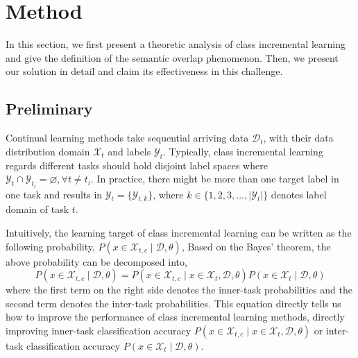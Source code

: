 \section{Method}
\label{sec:Method}

% 

In this section, we first present a theoretic analysis of class incremental learning and give the definition of the semantic overlap phenomenon. Then, we present our solution in detail and claim its effectiveness in this challenge.

\subsection{Preliminary}
\label{sec3-1:PSO_in_CL}


Continual learning methods take sequential arriving data $\mathcal{D}_t$, with their data distribution domain $\mathcal{X}_t$ and labels $\mathcal{Y}_t$. Typically, class incremental learning regards different tasks should hold disjoint label spaces where $\mathcal{Y}_t \cap \mathcal{Y}_{t_i} = \varnothing, \forall t \neq t_i$. In practice, there might be more than one target label in one task and results in $\mathcal{Y}_t = \{ \mathcal{Y}_{t, k} \}$, where $k \in \{1,2,3,..., \mid \mathcal{Y}_t \mid\}$ denotes label domain of task $t$.

Intuitively, the learning target of class incremental learning can be written as the following probability, $P(x \in \mathcal{X}_{t,c} \mid \mathcal{D}, \mathcal{\theta})$, Based on the Bayes' theorem, the above probability can be decomposed into, 
\begin{equation}
     P(x \in \mathcal{X}_{t,c} \mid \mathcal{D}, \theta) =  P(x \in \mathcal{X}_{t,c} \mid x \in \mathcal{X}_t, \mathcal{D}, \theta) P(x \in \mathcal{X}_{t} \mid \mathcal{D}, \theta) 
\end{equation}
where the first term on the right side denotes the inner-task probabilities and the second term denotes the inter-task probabilities. This equation directly tells us how to improve the performance of class incremental learning methods, directly improving inner-task classification accuracy $P(x \in \mathcal{X}_{t,c} \mid x \in \mathcal{X}_t, \mathcal{D}, \theta)$ or inter-task classification accuracy $P(x \in \mathcal{X}_{t} \mid \mathcal{D}, \theta)$. 


